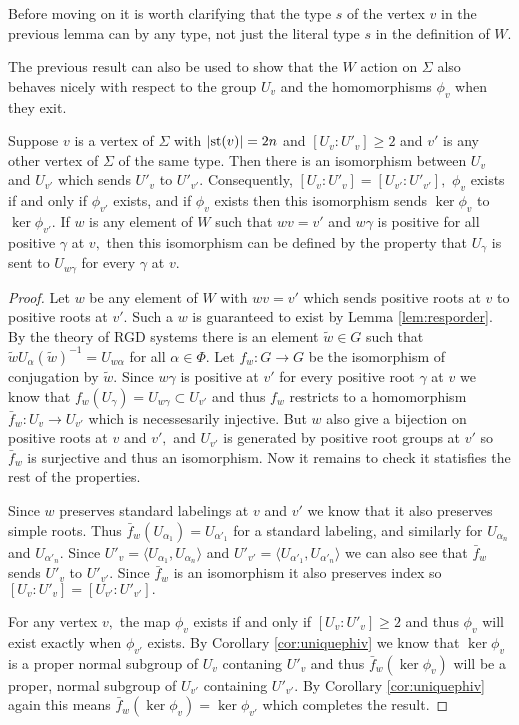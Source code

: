 \documentclass[class=book, crop=false,12 pt]{standalone}
\begin{document}
Before moving on it is worth clarifying that the type $s$ of the vertex $v$ in the previous lemma can by any type, not just the literal type $s$ in the definition of $W.$

The previous result can also be used to show that the $W$ action on $\Sigma$ also behaves nicely with respect to the group $U_v$ and the homomorphisms $\phi_v$ when they exit.
\begin{cor}
	\label{cor:respectphiv}
	Suppose $v$ is a vertex of $\Sigma$ with $|\mathrm{st}(v)|=2n$ and $[U_v:U'_v]\ge 2$ and $v'$ is any other vertex of $\Sigma$ of the same type. Then there is an isomorphism between $U_v$ and $U_{v'}$ which sends $U'_v$ to $U'_{v'}.$ Consequently, $[U_v:U'_v]=[U_{v'}:U'_{v'}],$ $\phi_v$ exists if and only if $\phi_{v'}$ exists, and if $\phi_v$ exists then this isomorphism sends $\ker \phi_v$ to $\ker \phi_{v'}.$ If $w$ is any element of $W$ such that $wv=v'$ and $w\gamma$ is positive for all positive $\gamma$ at $v,$ then this isomorphism can be defined by the property that $U_\gamma$ is sent to $U_{w\gamma}$ for every $\gamma$ at $v.$
\end{cor}
\begin{proof}
	Let $w$ be any element of $W$ with $wv=v'$ which sends positive roots at $v$ to positive roots at $v'.$ Such a $w$ is guaranteed to exist by Lemma \ref{lem:resporder}. By the theory of RGD systems there is an element $\tilde{w}\in G$ such that $\tilde{w}U_\alpha (\tilde{w})^{-1}=U_{w\alpha}$ for all $\alpha\in \Phi.$ Let $f_w:G\to G$ be the isomorphism of conjugation by $\tilde{w}.$ Since $w\gamma$ is positive at $v'$ for every positive root $\gamma$ at $v$ we know that $f_w(U_\gamma)=U_{w\gamma}\subset U_{v'}$ and thus $f_w$ restricts to a homomorphism $\bar{f}_w:U_v\to U_{v'}$ which is necessesarily injective. But $w$ also give a bijection on positive roots at $v$ and $v',$ and $U_{v'}$ is generated by positive root groups at $v'$ so $\bar{f}_w$ is surjective and thus an isomorphism. Now it remains to check it statisfies the rest of the properties. 

	Since $w$ preserves standard labelings at $v$ and $v'$ we know that it also preserves simple roots. Thus $\bar{f}_w(U_{\alpha_1})=U_{\alpha'_1}$ for a standard labeling, and similarly for $U_{\alpha_n}$ and $U_{\alpha'_n}.$ Since $U'_v=\langle U_{\alpha_1},U_{\alpha_n}\rangle$ and $U'_{v'}=\langle U_{\alpha'_1},U_{\alpha'_n}\rangle$ we can also see that $\bar{f}_w$ sends $U'_v$ to $U'_{v'}.$ Since $\bar{f}_w$ is an isomorphism it also preserves index so $[U_v:U'_v]=[U_{v'}:U'_{v'}].$

	For any vertex $v,$ the map $\phi_v$ exists if and only if $[U_v:U'_v]\ge 2$ and thus $\phi_v$ will exist exactly when $\phi_{v'}$ exists. By Corollary \ref{cor:uniquephiv} we know that $\ker \phi_v$ is a proper normal subgroup of $U_v$ contaning $U'_v$ and thus $\bar{f}_w(\ker \phi_v)$ will be a proper, normal subgroup of $U_{v'}$ containing $U'_{v'}.$ By Corollary \ref{cor:uniquephiv} again this means $\bar{f}_w(\ker \phi_v)=\ker \phi_{v'}$ which completes the result.

\end{proof}
\end{document}
